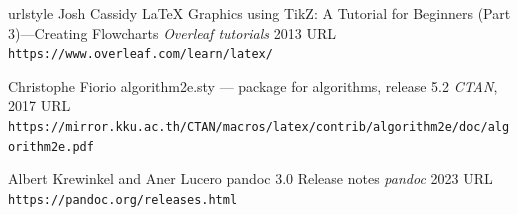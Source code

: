 \begin{thebibliography}{4}
    \providecommand{\natexlab}[1]{#1}
    \providecommand{\url}[1]{\texttt{#1}}
    \expandafter\ifx\csname urlstyle\endcsname\relax
      \providecommand{\doi}[1]{doi: #1}\else
      \providecommand{\doi}{doi: \begingroup \urlstyle{rm}\Url}\fi
{}
Josh Cassidy
\newblock LaTeX Graphics using TikZ: A Tutorial for Beginners (Part 3)—Creating Flowcharts
\newblock \emph{Overleaf tutorials}  2013
\newblock URL \url{https://www.overleaf.com/learn/latex/}

Christophe Fiorio
\newblock algorithm2e.sty — package for algorithms, release 5.2
\newblock \emph{CTAN}, 2017
\newblock URL \url{https://mirror.kku.ac.th/CTAN/macros/latex/contrib/algorithm2e/doc/algorithm2e.pdf}

Albert Krewinkel and Aner Lucero
\newblock pandoc 3.0 Release notes
\newblock \emph{pandoc}  2023
\newblock URL \url{https://pandoc.org/releases.html}

\end{thebibliography}


\address{%
Abhishek Ulayil\\
Student, Institute of Actuaries of India\\%
Mumbai, India\\
ORCiD: 0009-0000-6935-8690\\
}
